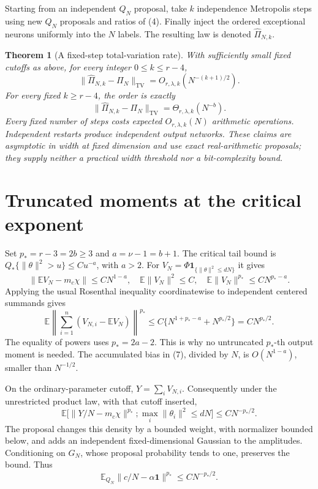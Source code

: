 \documentclass[11pt]{article}
\newtheorem{theorem}{Theorem}\newtheorem{lemma}[theorem]{Lemma}
\newcommand{\E}{\mathbb E}\newcommand{\R}{\mathbb R}
\newcommand{\one}{\mathbf1}\newcommand{\TV}{\mathrm{TV}}
\begin{document}
Starting from an independent $Q_N$ proposal, take $k$ independence
Metropolis steps using new $Q_N$ proposals and ratios of (4). Finally
inject the ordered exceptional neurons uniformly into the $N$ labels.
The resulting law is denoted $\widehat\Pi_{N,k}$.

\begin{theorem}[A fixed-step total-variation rate]\label{thm:rate}
With sufficiently small fixed cutoffs as above, for every integer
$0\le k\le r-4$,
\[
 \|\widehat\Pi_{N,k}-\Pi_N\|_{\TV}
                         =O_{r,\lambda,k}(N^{-(k+1)/2}). \tag{5}
\]
For every fixed $k\ge r-4$, the order is exactly
\[
 \|\widehat\Pi_{N,k}-\Pi_N\|_{\TV}
                              =\Theta_{r,\lambda,k}(N^{-b}). \tag{6}
\]
Every fixed number of steps costs expected $O_{r,\lambda,k}(N)$
arithmetic operations. Independent restarts produce independent output
networks. These claims are asymptotic in width at fixed dimension and
use exact real-arithmetic proposals; they supply neither a practical
width threshold nor a bit-complexity bound.
\end{theorem}

\section{Truncated moments at the critical exponent}
Set $p_*=r-3=2b\ge3$ and $a=\nu-1=b+1$. The critical tail bound is
$Q_*\{\|\theta\|^2>u\}\le Cu^{-a}$, with $a>2$.
For $V_N=\Phi\one_{\{\|\theta\|^2\le dN\}}$ it gives
\[
 \|\E V_N-m_c\chi\|\le CN^{1-a},\quad
 \E\|V_N\|^2\le C,\quad
 \E\|V_N\|^{p_*}\le CN^{p_*-a}.                        \tag{7}
\]
Applying the usual Rosenthal inequality coordinatewise to independent
centered summands gives
\[
 \E\left\|\sum_{i=1}^n(V_{N,i}-\E V_N)\right\|^{p_*}
 \le C\{N^{1+p_*-a}+N^{p_*/2}\}=CN^{p_*/2}.            \tag{8}
\]
The equality of powers uses $p_*=2a-2$. This is why no untruncated
$p_*$-th output moment is needed. The accumulated bias in (7), divided
by $N$, is $O(N^{1-a})$, smaller than $N^{-1/2}$.

On the ordinary-parameter cutoff, $Y=\sum_i V_{N,i}$. Consequently
under the unrestricted product law, with that cutoff inserted,
\[
 \E\big[\|Y/N-m_c\chi\|^{p_*};\max_i\|\theta_i\|^2\le dN\big]
                                                  \le CN^{-p_*/2}. \tag{9}
\]
The proposal changes this density by a bounded weight, with normalizer
bounded below, and adds an independent fixed-dimensional Gaussian to
the amplitudes. Conditioning on $G_N$, whose proposal probability tends
to one, preserves the bound. Thus
\[
                    \E_{Q_N}\|c/N-\alpha\mathbf1\|^{p_*}
                                                  \le CN^{-p_*/2}. \tag{10}
\]
\end{document}
